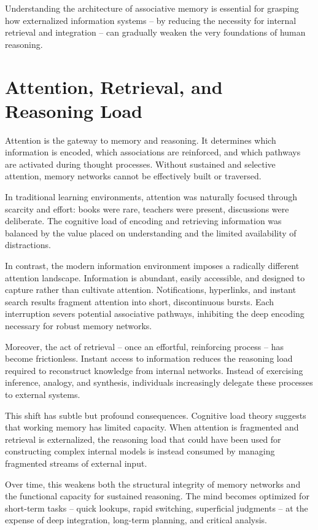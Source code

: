 Understanding the architecture of associative memory is essential for
grasping how externalized information systems -- by reducing the
necessity for internal retrieval and integration -- can gradually weaken
the very foundations of human reasoning.



\section{Attention, Retrieval, and Reasoning Load}

Attention is the gateway to memory and reasoning. It determines which
information is encoded, which associations are reinforced, and which
pathways are activated during thought processes. Without sustained and
selective attention, memory networks cannot be effectively built or
traversed.

In traditional learning environments, attention was naturally focused
through scarcity and effort: books were rare, teachers were present,
discussions were deliberate. The cognitive load of encoding and
retrieving information was balanced by the value placed on understanding
and the limited availability of distractions.

In contrast, the modern information environment imposes a radically
different attention landscape. Information is abundant, easily
accessible, and designed to capture rather than cultivate attention.
Notifications, hyperlinks, and instant search results fragment attention
into short, discontinuous bursts. Each interruption severs potential
associative pathways, inhibiting the deep encoding necessary for robust
memory networks.

Moreover, the act of retrieval -- once an effortful, reinforcing process
-- has become frictionless. Instant access to information reduces the
reasoning load required to reconstruct knowledge from internal networks.
Instead of exercising inference, analogy, and synthesis, individuals
increasingly delegate these processes to external systems.

This shift has subtle but profound consequences. Cognitive load theory
suggests that working memory has limited capacity. When attention is
fragmented and retrieval is externalized, the reasoning load that could
have been used for constructing complex internal models is instead
consumed by managing fragmented streams of external input.

Over time, this weakens both the structural integrity of memory networks
and the functional capacity for sustained reasoning. The mind becomes
optimized for short-term tasks -- quick lookups, rapid switching,
superficial judgments -- at the expense of deep integration, long-term
planning, and critical analysis.

